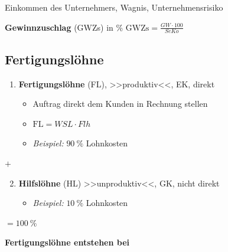Einkommen des Unternehmers, Wagnis, Unternehmensrisiko

\textbf{Gewinnzuschlag} (GWZs) in \%
$\boxed{\text{GWZs} = \frac{GW \cdot 100}{SeKo}}$

\newpage

\subsection{Fertigungslöhne}\label{fertigungsloehne}

\begin{enumerate}
\item
  \textbf{Fertigungslöhne} (FL), >>produktiv<<, EK, direkt

  \begin{itemize}
  \item
    Auftrag direkt dem Kunden in Rechnung stellen
  \item
    $\boxed{\text{FL} = WSL \cdot Flh}$
  \item
    \emph{Beispiel:} $90~\%$ Lohnkosten
  \end{itemize}
\end{enumerate}

$+$

\begin{enumerate}
\setcounter{enumi}{1}
\item
  \textbf{Hilfslöhne} (HL) >>unproduktiv<<, GK, nicht direkt

  \begin{itemize}
  \item
    \emph{Beispiel:} $10~\%$ Lohnkosten
  \end{itemize}
\end{enumerate}

$= 100~\%$

\textbf{Fertigungslöhne entstehen bei}

